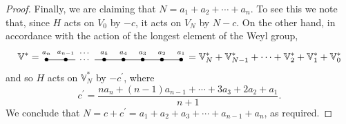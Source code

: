 \documentclass[pdftex]{sigma}
\begin{document}
\begin{proof}
Finally, we are claiming that $N=a_1+a_2+\cdots+a_n$. To see this we note that,
since $H$ acts on $V_0$ by $-c$, it acts on $V_N$ by $N-c$. On the other hand,
in accordance with the action of the longest element of the Weyl group,
\[{\mathbb{V}}^*=\enskip\raisebox{-5pt}{\begin{picture}(140,17)
\put(0,5){\makebox(0,0){$\bullet$}}
\put(20,5){\makebox(0,0){$\bullet$}}
\put(60,5){\makebox(0,0){$\bullet$}}
\put(80,5){\makebox(0,0){$\bullet$}}
\put(100,5){\makebox(0,0){$\bullet$}}
\put(120,5){\makebox(0,0){$\bullet$}}
\put(140,5){\makebox(0,0){$\bullet$}}
\put(0,5){\line(1,0){30}}
\put(40,5){\makebox(0,0){\scriptsize$\cdots$}}
\put(50,5){\line(1,0){90}}
\put(0,12){\makebox(0,0){\scriptsize$a_n$}}
\put(20,12){\makebox(0,0){\scriptsize$a_{n-1}$}}
\put(40,12){\makebox(0,0){\scriptsize$\cdots$}}
\put(60,12){\makebox(0,0){\scriptsize$a_5$}}
\put(80,12){\makebox(0,0){\scriptsize$a_4$}}
\put(100,12){\makebox(0,0){\scriptsize$a_3$}}
\put(120,12){\makebox(0,0){\scriptsize$a_2$}}
\put(140,12){\makebox(0,0){\scriptsize$a_1$}}
\end{picture}}\enskip={\mathbb{V}}_N^*+{\mathbb{V}}_{N-1}^*+\cdots+
{\mathbb{V}}_2^*+{\mathbb{V}}_1^*+{\mathbb{V}}_0^*\]
and so $H$ acts on ${\mathbb{V}}_N^*$ by $-c^\prime$, where
\[c^\prime=\frac{na_n+(n-1)a_{n-1}+\cdots+3a_3+2a_2+a_1}{n+1}.\]
We conclude that $N=c+c^\prime=a_1+a_2+a_3+\cdots+a_{n-1}+a_n$, as required.
\end{proof}
\end{document}
